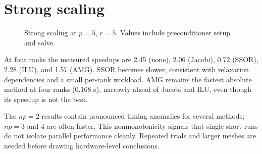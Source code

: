 \documentclass[10pt,a4paper]{article}
\newcommand{\methodstyle}[2]{\addplot+[thick,mark=#1,color=#2]}
\begin{document}
\section{Strong scaling}
\begin{figure}[h]
\centering
{}
\caption{Strong scaling at $p=5$, $r=5$. Values include preconditioner setup and solve.}
\label{fig:scaling}
\end{figure}

At four ranks the measured speedups are 2.45 (none), 2.06 (Jacobi), 0.72 (SSOR), 2.28 (ILU),
and 1.57 (AMG). SSOR becomes slower, consistent with relaxation dependencies and a small
per-rank workload. AMG remains the fastest absolute method at four ranks (0.168 s), narrowly ahead
of Jacobi and ILU, even though its speedup is not the best.

The $np=2$ results contain pronounced timing anomalies for several methods; $np=3$ and 4 are
often faster. This nonmonotonicity signals that single short runs do not isolate parallel performance
cleanly. Repeated trials and larger meshes are needed before drawing hardware-level conclusions.

\newpage
\end{document}

